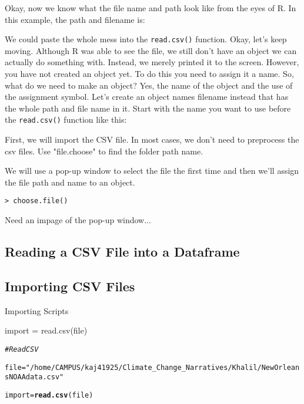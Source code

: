 \documentclass{article}\usepackage[]{graphicx}\usepackage[]{color}
\makeatletter
\newcommand{\hlstr}[1]{\textcolor[rgb]{0.192,0.494,0.8}{#1}}%
\newcommand{\hlcom}[1]{\textcolor[rgb]{0.678,0.584,0.686}{\textit{#1}}}%
\newcommand{\hlstd}[1]{\textcolor[rgb]{0.345,0.345,0.345}{#1}}%
\newcommand{\hlkwb}[1]{\textcolor[rgb]{0.69,0.353,0.396}{#1}}%
\newcommand{\hlkwd}[1]{\textcolor[rgb]{0.737,0.353,0.396}{\textbf{#1}}}%
\newenvironment{kframe}{%
 \def\at@end@of@kframe{}%
 \ifinner\ifhmode%
  \def\at@end@of@kframe{\end{minipage}}%
  \begin{minipage}{\columnwidth}%
 \fi\fi%
 \def\FrameCommand##1{\hskip\@totalleftmargin \hskip-\fboxsep
 \colorbox{shadecolor}{##1}\hskip-\fboxsep
     \hskip-\linewidth \hskip-\@totalleftmargin \hskip\columnwidth}%
 \MakeFramed {\advance\hsize-\width
   \@totalleftmargin\z@ \linewidth\hsize
   \@setminipage}}%
 {\par\unskip\endMakeFramed%
 \at@end@of@kframe}
\newenvironment{knitrout}{}{} %
\makeatother
\begin{document}
Okay, now we know what the file name and path look like from the eyes of R. In this example, the path and filename is:


We could paste the whole mess into the \texttt{read.csv()} function. Okay, let's keep moving. Although R was able to see the file, we still don't have an object we can actually do something with. Instead, we merely printed it to the screen. However, you have not created an object yet. To do this you need to assign it a name. So, what do we need to make an object?  Yes, the name of the object and the use of the assignment symbol. Let's create an object names filename instead that has the whole path and file name in it. Start with the name you want to use before the \texttt{read.csv()} function like this:

First, we will import the CSV file. In most cases, we don't need to preprocess the csv files. Use "file.choose" to find the folder path name. 

We will use a pop-up window to select the file the first time and then we'll assign the file path and name to an object. 

\begin{verbatim}
> choose.file()
\end{verbatim}

Need an impage of the pop-up window...

\subsection{Reading a CSV File into a Dataframe}


\subsection{Importing CSV Files}


Importing Scripts


import = read.csv(file)

\begin{knitrout}
\color{fgcolor}\begin{kframe}
\begin{alltt}
\hlcom{# Read CSV}

\hlstd{file} \hlkwb{=} \hlstr{"/home/CAMPUS/kaj41925/Climate_Change_Narratives/Khalil/NewOrleansNOAAdata.csv"}

\hlstd{import} \hlkwb{=} \hlkwd{read.csv}\hlstd{(file)}
\end{alltt}
\end{kframe}
\end{knitrout}
\end{document}

